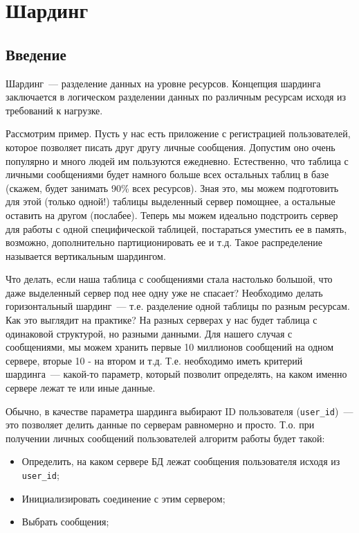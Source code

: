 \chapter{Шардинг}

\begin{epigraphs}
\end{epigraphs}

\section{Введение}

Шардинг~--- разделение данных на уровне ресурсов. Концепция шардинга заключается в логическом разделении данных по различным ресурсам исходя из требований к нагрузке.

Рассмотрим пример. Пусть у нас есть приложение с регистрацией пользователей, которое позволяет писать друг другу личные сообщения. Допустим оно очень популярно и много людей им пользуются ежедневно. Естественно, что таблица с личными сообщениями будет намного больше всех остальных таблиц в базе (скажем, будет занимать 90\% всех ресурсов). Зная это, мы можем подготовить для этой (только одной!) таблицы выделенный сервер помощнее, а остальные оставить на другом (послабее). Теперь мы можем идеально подстроить сервер для работы с одной специфической таблицей, постараться уместить ее в память, возможно, дополнительно партиционировать ее и т.д. Такое распределение называется вертикальным шардингом.

Что делать, если наша таблица с сообщениями стала настолько большой, что даже выделенный сервер под нее одну уже не спасает? Необходимо делать горизонтальный шардинг~--- т.е. разделение одной таблицы по разным ресурсам. Как это выглядит на практике? На разных серверах у нас будет таблица с одинаковой структурой, но разными данными. Для нашего случая с сообщениями, мы можем хранить первые 10 миллионов сообщений на одном сервере, вторые 10 - на втором и т.д. Т.е. необходимо иметь критерий шардинга~--- какой-то параметр, который позволит определять, на каком именно сервере лежат те или иные данные.

Обычно, в качестве параметра шардинга выбирают ID пользователя (\lstinline!user_id!)~--- это позволяет делить данные по серверам равномерно и просто. Т.о. при получении личных сообщений пользователей алгоритм работы будет такой:

\begin{itemize}
  \item Определить, на каком сервере БД лежат сообщения пользователя исходя из \lstinline!user_id!;
  \item Инициализировать соединение с этим сервером;
  \item Выбрать сообщения;
\end{itemize}

